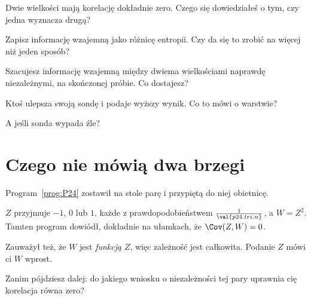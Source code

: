 \begin{quiz}
\item Dwie wielkości mają korelację dokładnie zero. Czego się dowiedziałeś o
  tym, czy jedna wyznacza drugą? 
\item Zapisz informację wzajemną jako różnicę entropii. Czy da się to zrobić
  na więcej niż jeden sposób? 
\item Szacujesz informację wzajemną między dwiema wielkościami naprawdę
  niezależnymi, na skończonej próbie. Co dostajesz? 
\item Ktoś ulepsza swoją sondę i podaje wyższy wynik. Co to mówi o warstwie?
\item A jeśli sonda wypada źle? 
\end{quiz}

\section{Czego nie mówią dwa brzegi}
\label{sec:P31-margins}

\begin{fr}
Program~\ref{prog:P24} zostawił na stole parę i przypiętą do niej obietnicę.

$Z$ przyjmuje $-1$, $0$ lub $1$, każde z prawdopodobieństwem
$\frac{1}{\val{p24.tri.n}}$, a $W = Z^{2}$. Tamten program dowiódł, dokładnie
na ułamkach, że $\Cov(Z, W) = 0$.

Zauważył też, że $W$ jest \emph{funkcją} $Z$, więc zależność jest całkowita.
Podanie $Z$ mówi ci $W$ wprost.

Zanim pójdziesz dalej: do jakiego wniosku o niezależności tej pary uprawnia
cię korelacja równa zero?
\dotline
\nextframe
\end{fr}

